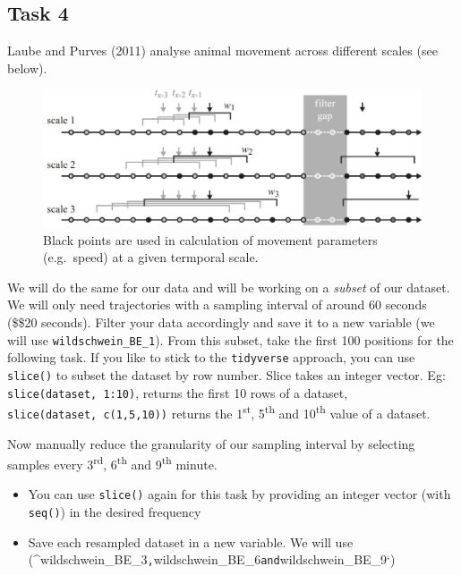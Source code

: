 \documentclass[]{book}
\providecommand{\tightlist}{%
  \setlength{\itemsep}{0pt}\setlength{\parskip}{0pt}}
\theoremstyle{definition}
\theoremstyle{definition}
\theoremstyle{definition}
\theoremstyle{remark}
\begin{document}
\subsection{Task 4}\label{task-4}

Laube and Purves (2011) analyse animal movement across different scales
(see below).

\begin{figure}[htbp]
\centering
\includegraphics{02_Images/laube_2011_2.jpg}
\caption{Black points are used in calculation of movement parameters
(e.g.~speed) at a given termporal scale.}
\end{figure}

We will do the same for our data and will be working on a \emph{subset}
of our dataset. We will only need trajectories with a sampling interval
of around 60 seconds (\$\pm\$20 seconds). Filter your data accordingly
and save it to a new variable (we will use \texttt{wildschwein\_BE\_1}).
From this subset, take the first 100 positions for the following task.
If you like to stick to the \texttt{tidyverse} approach, you can use
\texttt{slice()} to subset the dataset by row number. Slice takes an
integer vector. Eg: \texttt{slice(dataset,\ 1:10)}, returns the first 10
rows of a dataset, \texttt{slice(dataset,\ c(1,5,10))} returns the
1\textsuperscript{st}, 5\textsuperscript{th} and 10\textsuperscript{th}
value of a dataset.

Now manually reduce the granularity of our sampling interval by
selecting samples every 3\textsuperscript{rd}, 6\textsuperscript{th} and
9\textsuperscript{th} minute.

\begin{itemize}
\tightlist
\item
  You can use \texttt{slice()} again for this task by providing an
  integer vector (with \texttt{seq()}) in the desired frequency
\item
  Save each resampled dataset in a new variable. We will use
  (\^{}wildschwein\_BE\_3\texttt{,}wildschwein\_BE\_6\texttt{and}wildschwein\_BE\_9`)
\end{itemize}
\end{document}
